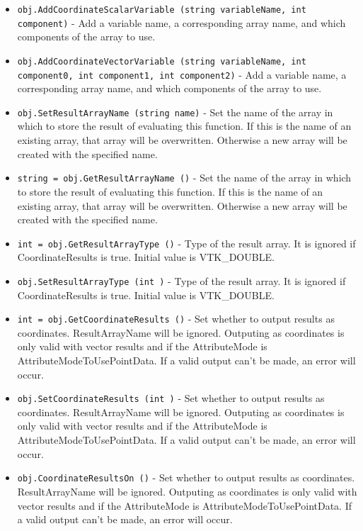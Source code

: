 \begin{itemize}
\item  \verb|obj.AddCoordinateScalarVariable (string variableName, int component)| -  Add a variable name, a corresponding array name, and which components of
 the array to use.

\item  \verb|obj.AddCoordinateVectorVariable (string variableName, int component0, int component1, int component2)| -  Add a variable name, a corresponding array name, and which components of
 the array to use.

\item  \verb|obj.SetResultArrayName (string name)| -  Set the name of the array in which to store the result of
 evaluating this function.  If this is the name of an existing array,
 that array will be overwritten.  Otherwise a new array will be
 created with the specified name.

\item  \verb|string = obj.GetResultArrayName ()| -  Set the name of the array in which to store the result of
 evaluating this function.  If this is the name of an existing array,
 that array will be overwritten.  Otherwise a new array will be
 created with the specified name.

\item  \verb|int = obj.GetResultArrayType ()| -  Type of the result array. It is ignored if CoordinateResults is true.
 Initial value is VTK\_DOUBLE.

\item  \verb|obj.SetResultArrayType (int )| -  Type of the result array. It is ignored if CoordinateResults is true.
 Initial value is VTK\_DOUBLE.

\item  \verb|int = obj.GetCoordinateResults ()| -  Set whether to output results as coordinates.  ResultArrayName will be
 ignored.  Outputing as coordinates is only valid with vector results and
 if the AttributeMode is AttributeModeToUsePointData.
 If a valid output can't be made, an error will occur.

\item  \verb|obj.SetCoordinateResults (int )| -  Set whether to output results as coordinates.  ResultArrayName will be
 ignored.  Outputing as coordinates is only valid with vector results and
 if the AttributeMode is AttributeModeToUsePointData.
 If a valid output can't be made, an error will occur.

\item  \verb|obj.CoordinateResultsOn ()| -  Set whether to output results as coordinates.  ResultArrayName will be
 ignored.  Outputing as coordinates is only valid with vector results and
 if the AttributeMode is AttributeModeToUsePointData.
 If a valid output can't be made, an error will occur.


\end{itemize}

